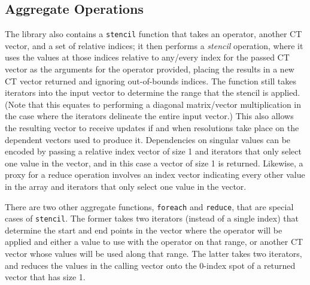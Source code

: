 \subsection{Aggregate Operations}
The library also contains a \texttt{stencil} function that takes an operator,
another CT vector, and a set of relative indices; it then performs a 
\textit{stencil} operation, where it uses the values at those indices relative to
any/every index for the passed CT vector as the arguments for the operator
provided, placing the results in a new CT vector returned and ignoring
out-of-bounds indices. The function still takes iterators into the input vector
to determine the range that the stencil is applied. (Note that this equates to
performing a diagonal matrix/vector multiplication in the case where the iterators
delineate the entire input vector.) This also allows the resulting vector to
receive updates if and when resolutions take place on the dependent vectors used
to produce it. Dependencies on singular values can be encoded by passing a
relative index vector of size 1 and iterators that only select one value in the
vector, and in this case a vector of size 1 is returned. Likewise, a proxy for a
reduce operation involves an index vector indicating every other value in the
array and iterators that only select one value in the vector.

There are two other aggregate functions, \texttt{foreach} and \texttt{reduce}, that are
special cases of \texttt{stencil}. The
former takes two iterators (instead of a single index) that determine the start
and end points in the vector where the operator will be applied and either a value to use 
with the operator on that range, or another CT vector whose values will be used along 
that range. The latter takes two iterators, and reduces the values in the calling 
vector onto the 0-index spot of a returned vector that has size 1.

